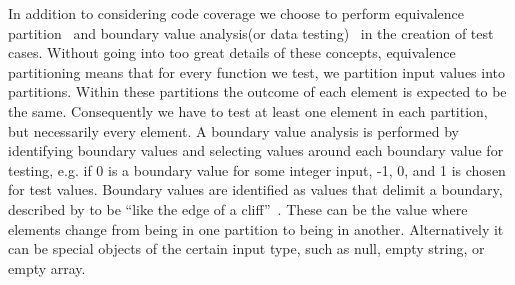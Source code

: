 In addition to considering code coverage we choose to perform equivalence partition~\cite[pp.~67-69]{Patton05} and boundary value analysis(or data testing)~\cite[pp.~70-79]{Patton05} in the creation of test cases.
Without going into too great details of these concepts, equivalence partitioning means that for every function we test, we partition input values into partitions.
Within these partitions the outcome of each element is expected to be the same.
Consequently we have to test at least one element in each partition, but necessarily every element.
A boundary value analysis is performed by identifying boundary values and selecting values around each boundary value for testing, e.g. if 0 is a boundary value for some integer input, -1, 0, and 1 is chosen for test values.
Boundary values are identified as values that delimit a boundary, described by \citeauthor{Patton05} to be ``like the edge of a cliff''~\cite[p.~71]{Patton05}.
These can be the value where elements change from being in one partition to being in another.
Alternatively it can be special objects of the certain input type, such as null, empty string, or empty array.
